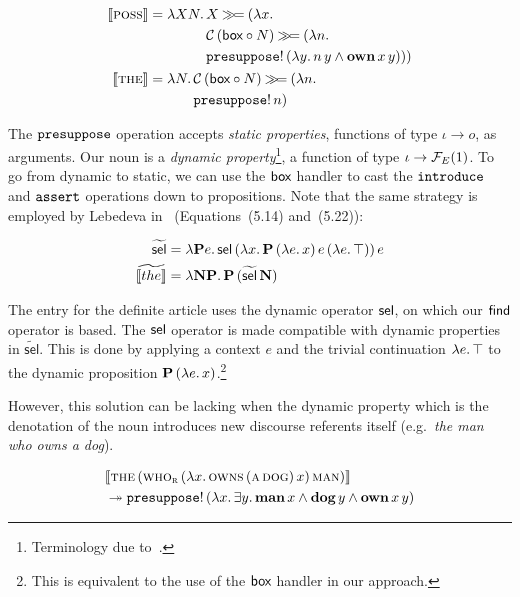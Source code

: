 \begin{align*}
  \llbracket \textsc{poss} \rrbracket &= \lambda X N.\, \begin{aligned}[t]
      &X \mathbin{\gg\!=} (\lambda x.\,  \\
      &\mathcal{C}\,(\textsf{box} \circ N) \mathbin{\gg\!=} (\lambda n.\,  \\
      &\mathtt{presuppose}!\,(\lambda y.\, n\,y \land \textbf{own}\,x\,y)))
    \end{aligned} \\
  \llbracket \textsc{the} \rrbracket &= \lambda N.\, \begin{aligned}[t]
      &\mathcal{C}\,(\textsf{box} \circ N) \mathbin{\gg\!=} (\lambda n.\,  \\
      &\mathtt{presuppose}!\,n)
    \end{aligned}
\end{align*}

The $\mathtt{presuppose}$ operation accepts \emph{static properties}, functions
of type $\iota \to o$, as arguments. Our noun is a \emph{dynamic
  property}\footnote{Terminology due to~\cite{lebedeva2012expression}.}, a
function of type $\iota \to \mathcal{F}_E(1)$. To go from dynamic to static, we can
use the $\textsf{box}$ handler to cast the $\mathtt{introduce}$ and $\mathtt{assert}$
operations down to propositions. Note that the same strategy is employed by
Lebedeva in~\cite{lebedeva2012expression} (Equations~(5.14) and~(5.22)):

\begin{align*}
  \widetilde{\textsf{sel}} &= \lambda \textbf{P} e.\, \textsf{sel}\,(\lambda x.\, \textbf{P}\,(\lambda e.\, x)\,e\,(\lambda e.\, \top))\,e \\
  \widetilde{\llbracket the \rrbracket} &= \lambda \textbf{N} \textbf{P}.\, \textbf{P}\,(\widetilde{\textsf{sel}}\,\textbf{N})
\end{align*}

The entry for the definite article uses the dynamic operator $\textsf{sel}$, on
which our $\textsf{find}$ operator is based. The $\textsf{sel}$ operator is made compatible
with dynamic properties in $\widetilde{\textsf{sel}}$. This is done by
applying a context $e$ and the trivial continuation $\lambda e.\, \top$ to the
dynamic proposition $\textbf{P}\,(\lambda e.\, x)$.\footnote{This is
  equivalent to the use of the $\textsf{box}$ handler in our approach.}

However, this solution can be lacking when the dynamic property which is
the denotation of the noun introduces new discourse referents itself (e.g.\
\emph{the man who owns a dog}).

\begin{align*}
& \llbracket \textsc{the}\,(\textsc{who}_{\textsc{r}}\,(\lambda x.\, \textsc{owns}\,(\textsc{a}\,\textsc{dog})\,x)\,\textsc{man}) \rrbracket \\
& \twoheadrightarrow \mathtt{presuppose}!\,(\lambda x.\, \exists y.\, \textbf{man}\,x \land
  \textbf{dog}\,y \land \textbf{own}\,x\,y)
\end{align*}

